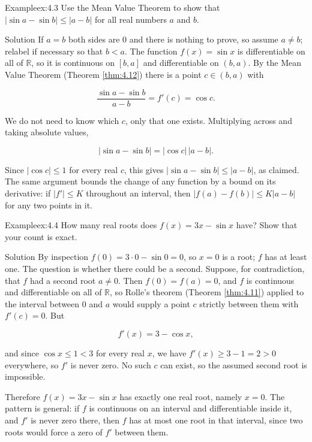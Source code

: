 \documentclass[a4paper,12pt,oneside]{memoir}
\begin{document}
\begin{workedexample}
\begin{envexample}{Example}{ex:4.3}{}
Use the Mean Value Theorem to show that \(\lvert \sin a - \sin b \rvert \le \lvert a - b \rvert\) for all real numbers \(a\) and \(b\).
\end{envexample}
\begin{envsolution}{Solution}{}{}
If \(a = b\) both sides are \(0\) and there is nothing to prove, so assume \(a \ne b\); relabel if necessary so that \(b < a\). The function \(f(x) = \sin x\) is differentiable on all of \(\mathbb{R}\), so it is continuous on \([b, a]\) and differentiable on \((b, a)\). By the Mean Value Theorem (Theorem \ref{thm:4.12}) there is a point \(c \in (b, a)\) with

\[ \frac{\sin a - \sin b}{a - b} = f'(c) = \cos c. \]

We do not need to know which \(c\), only that one exists. Multiplying across and taking absolute values,

\[ \lvert \sin a - \sin b \rvert = \lvert \cos c \rvert \,\lvert a - b \rvert. \]

Since \(\lvert \cos c \rvert \le 1\) for every real \(c\), this gives \(\lvert \sin a - \sin b \rvert \le \lvert a - b \rvert\), as claimed. The same argument bounds the change of any function by a bound on its derivative: if \(\lvert f' \rvert \le K\) throughout an interval, then \(\lvert f(a) - f(b) \rvert \le K \lvert a - b \rvert\) for any two points in it. \qedmark
\end{envsolution}
\end{workedexample}
\begin{workedexample}
\begin{envexample}{Example}{ex:4.4}{}
How many real roots does \(f(x) = 3x - \sin x\) have? Show that your count is exact.
\end{envexample}
\begin{envsolution}{Solution}{}{}
By inspection \(f(0) = 3 \cdot 0 - \sin 0 = 0\), so \(x = 0\) is a root; \(f\) has at least one. The question is whether there could be a second. Suppose, for contradiction, that \(f\) had a second root \(a \ne 0\). Then \(f(0) = f(a) = 0\), and \(f\) is continuous and differentiable on all of \(\mathbb{R}\), so Rolle’s theorem (Theorem \ref{thm:4.11}) applied to the interval between \(0\) and \(a\) would supply a point \(c\) strictly between them with \(f'(c) = 0\). But

\[ f'(x) = 3 - \cos x, \]

and since \(\cos x \le 1 < 3\) for every real \(x\), we have \(f'(x) \ge 3 - 1 = 2 > 0\) everywhere, so \(f'\) is never zero. No such \(c\) can exist, so the assumed second root is impossible.

Therefore \(f(x) = 3x - \sin x\) has exactly one real root, namely \(x = 0\). The pattern is general: if \(f\) is continuous on an interval and differentiable inside it, and \(f'\) is never zero there, then \(f\) has at most one root in that interval, since two roots would force a zero of \(f'\) between them. \qedmark
\end{envsolution}
\end{workedexample}
\end{document}
